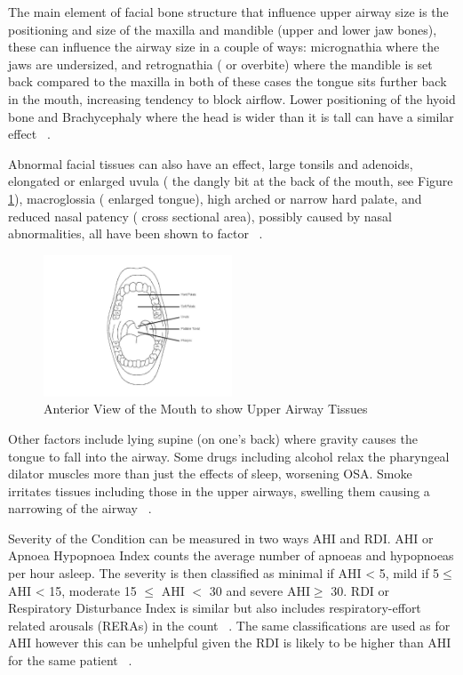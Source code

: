 The main element of facial bone structure that influence upper airway size is the positioning and size of the maxilla and mandible (upper and lower jaw bones), these can influence the airway size in a couple of ways: micrognathia where the jaws are undersized, and retrognathia ( or overbite) where the mandible is set back compared to the maxilla in both of these cases the tongue sits further back in the mouth, increasing tendency to block airflow. Lower positioning of the hyoid bone and Brachycephaly where the head is wider than it is tall can have a similar effect ~\cite{lowe1995cephalometric}.

Abnormal facial tissues can also have an effect, large tonsils and adenoids, elongated or enlarged uvula ( the dangly bit at the back of the mouth, see Figure \ref{fig:Anterior-View-Mouth}), macroglossia ( enlarged tongue), high arched or narrow hard palate, and reduced nasal patency ( cross sectional area), possibly caused by nasal abnormalities, all have been shown to factor ~\cite{schwab1995upper}.

\begin{figure}[h]
\centering
\includegraphics[width=0.5\textwidth]{drawings/Anterior-View-Mouth}
\caption{Anterior View of the Mouth to show Upper Airway Tissues~\cite{anteriormouth}}
\label{fig:Anterior-View-Mouth}
\end{figure}

Other factors include lying supine (on one’s back) where gravity causes the tongue to fall into the airway. Some drugs including alcohol relax the pharyngeal dilator muscles more than just the effects of sleep, worsening OSA. Smoke irritates tissues including those in the upper airways, swelling them causing a narrowing of the airway ~\cite{apneosotherfactors}.

 Severity of the Condition can be measured in two ways AHI and RDI. AHI or Apnoea Hypopnoea Index counts the average number of apnoeas and hypopnoeas per hour asleep. The severity is then classified as minimal if AHI < 5, mild if 5$\leq$ AHI < 15, moderate 15 $\leq$ AHI $<$ 30 and severe AHI$\geq$ 30. RDI or Respiratory Disturbance Index is similar but also includes respiratory-effort related arousals (RERAs) in the count ~\cite{AHI}. The same classifications are used as for AHI however this can be unhelpful given the RDI is likely to be higher than AHI for the same patient ~\cite{epstein2009clinical}.

